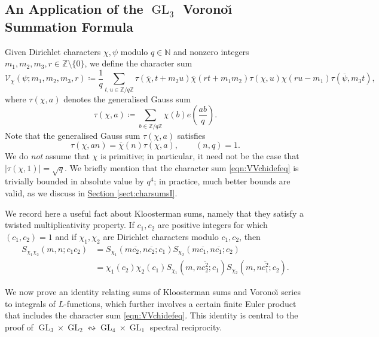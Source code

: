 \documentclass[11pt,a4paper]{amsart}
\newcommand{\N}{\mathbb{N}}
\newcommand{\VV}{\mathcal{V}}
\newcommand{\Z}{\mathbb{Z}}
\DeclareMathOperator{\GL}{GL}
\numberwithin{equation}{section}
\theoremstyle{remark}
\theoremstyle{definition}
\begin{document}
\subsection{An Application of the \texorpdfstring{$\GL_3$}{GL\textthreeinferior} Vorono\u{\i} Summation Formula}

Given Dirichlet characters $\chi,\psi$ modulo $q \in \N$ and nonzero integers $m_1,m_2,m_3,r \in \Z \setminus \{0\}$, we define the character sum
\begin{equation}
\label{eqn:VVchidefeq}
\VV_{\chi}(\psi;m_1,m_2,m_3,r) \coloneqq \frac{1}{q} \sum_{t,u \in \Z/q\Z} \tau(\overline{\chi},t + m_2 u) \overline{\chi}(rt + m_1 m_2) \tau(\chi,u) \chi(ru - m_1) \tau(\overline{\psi},m_3 t),
\end{equation}
where $\tau(\chi,a)$ denotes the generalised Gauss sum
\begin{equation}
\label{eqn:tauchiadefeq}
\tau(\chi,a) \coloneqq \sum_{b \in \Z/q\Z} \chi(b) e\left(\frac{ab}{q}\right).
\end{equation}
Note that the generalised Gauss sum $\tau(\chi,a)$ satisfies
\begin{equation}
\label{eqn:GausssumCOV}
\tau(\chi,an) = \overline{\chi}(n) \tau(\chi,a), \qquad (n,q) = 1.
\end{equation}
We do \emph{not} assume that $\chi$ is primitive; in particular, it need not be the case that $|\tau(\chi,1)| = \sqrt{q}$. We briefly mention that the character sum \eqref{eqn:VVchidefeq} is trivially bounded in absolute value by $q^4$; in practice, much better bounds are valid, as we discuss in \hyperref[sect:charsumsI]{Section \ref*{sect:charsumsI}}.

We record here a useful fact about Kloosterman sums, namely that they satisfy a twisted multiplicativity property. If $c_1,c_2$ are positive integers for which $(c_1,c_2) = 1$ and if $\chi_1,\chi_2$ are Dirichlet characters modulo $c_1,c_2$, then
\begin{equation}
\label{eqn:Kloostermantwistedmult}
\begin{split}
S_{\chi_1 \chi_2}(m,n;c_1 c_2) & = S_{\chi_1}(m\overline{c_2},n\overline{c_2};c_1) S_{\chi_2}(m\overline{c_1},n\overline{c_1};c_2)	\\
& = \chi_1(c_2) \chi_2(c_1)S_{\chi_1}(m,n\overline{c_2^2};c_1) S_{\chi_2}(m,n\overline{c_1^2};c_2).
\end{split}
\end{equation}

We now prove an identity relating sums of Kloosterman sums and Vorono\u{\i} series to integrals of $L$-functions, which further involves a certain finite Euler product that includes the character sum \eqref{eqn:VVchidefeq}. This identity is central to the proof of $\GL_3 \times \GL_2 \leftrightsquigarrow \GL_4 \times \GL_1$ spectral reciprocity.
\end{document}
